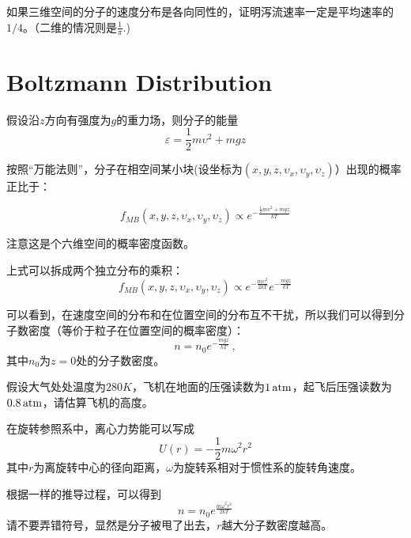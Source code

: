 \documentclass[CJK]{beamer}
\begin{document}
\begin{frame}
\bch


{\large
如果三维空间的分子的速度分布是各向同性的，证明泻流速率一定是平均速率的$1/4$。（二维的情况则是$\frac{1}{\pi}.$)
}

\ech
\end{frame}

\section{Boltzmann Distribution}


\begin{frame}
\bch
{\large
假设沿$z$方向有强度为$g$的重力场，则分子的能量
$$\varepsilon = \frac{1}{2}m\upsilon^2 + mgz$$

按照“万能法则”，分子在相空间某小块(设坐标为$(x, y, z, \upsilon_x, \upsilon_y, \upsilon_z)$）出现的概率正比于：

$$f_{MB}(x, y, z, \upsilon_x, \upsilon_y,\upsilon_z) \propto e^{-\frac{\frac{1}{2}m\upsilon^2 + mgz}{kT}}$$

注意这是个六维空间的概率密度函数。
}
\ech
\end{frame}

\begin{frame}
\bch
{\large

上式可以拆成两个独立分布的乘积：
$$f_{MB}(x, y, z, \upsilon_x, \upsilon_y,\upsilon_z) \propto e^{-\frac{m\upsilon^2}{2kT}} e^{-\frac{mgz}{kT}}$$

可以看到，在速度空间的分布和在位置空间的分布互不干扰，所以我们可以得到分子数密度（等价于粒子在位置空间的概率密度）：
$$n = n_0 e^{-\frac{mgz}{kT}}\, ,$$
其中$n_0$为$z=0$处的分子数密度。}
\ech
\end{frame}


\begin{frame}
\bch
{}
{\Large
假设大气处处温度为$280K$，飞机在地面的压强读数为$1\,\mathrm{atm}$，起飞后压强读数为$0.8\,\mathrm{atm}$，请估算飞机的高度。}
\ech
\end{frame}

\begin{frame}
\bch
{
在旋转参照系中，离心力势能可以写成
$$U(r) = -\frac{1}{2}m\omega^2r^2$$
其中$r$为离旋转中心的径向距离，$\omega$为旋转系相对于惯性系的旋转角速度。

\skipline

根据一样的推导过程，可以得到
$$n = n_0 e^{\frac{m\omega^2r^2}{2kT}}$$
请不要弄错符号，显然是分子被甩了出去，$r$越大分子数密度越高。
}
\ech
\end{frame}
\end{document}

